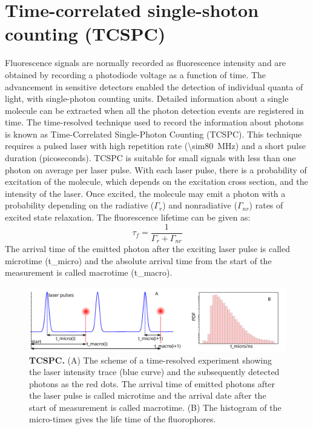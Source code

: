\section{Time-correlated single-shoton counting (TCSPC)}
Fluorescence signals are normally recorded as fluorescence intensity and are obtained by recording a photodiode voltage as a function of time.
The advancement in sensitive detectors enabled the detection of individual quanta of light, with single-photon counting units.
Detailed information about a single molecule can be extracted when all the photon detection events are registered in time.
The time-resolved technique used to record the information about photons is known as Time-Correlated Single-Photon Counting (TCSPC).\cite{oconnor2012timecorrelated,birch2002topics}
This technique requires a pulsed laser with high repetition rate (\SI{\sim80}{\MHz}) and a short pulse duration (picoseconds).
TCSPC is suitable for small signals with less than one photon on average per laser pulse.
With each laser pulse, there is a probability of excitation of the molecule, which depends on the excitation cross section, and the intensity of the laser.
Once excited, the molecule may emit a photon with a probability depending on the radiative ($\Gamma_{r}$) and nonradiative ($\Gamma_{nr}$) rates of excited state relaxation.
The fluorescence lifetime can be given as:
\begin{equation}
	\tau_f = \frac{1}{\Gamma_{r} + \Gamma_{nr}}
\end{equation}
The arrival time of the emitted photon after the exciting laser pulse is called microtime (t\_micro) and the absolute arrival time from the start of the measurement is called macrotime (t\_macro).
\begin{figure}
	\centering
	\includegraphics[width=\textwidth]{tcspc_sch}
	\caption{\textbf{TCSPC.} (A) The scheme of a time-resolved experiment showing the laser intensity trace (blue curve) and the subsequently detected photons as the red dots.
	The arrival time of emitted photons after the laser pulse is called microtime and the arrival date after the start of measurement is called macrotime.
	(B) The histogram of the micro-times gives the life time of the fluorophores.}
	\label{fig:tcspc_sch}
\end{figure}
